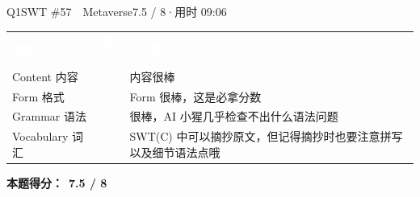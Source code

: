 \begin{qblock}{Q1\quad SWT \#57\ \ Metaverse}{7.5 / 8\quad·\quad 用时 09:06}
{\small\scorehead
\begin{tabularx}{\linewidth}{l c Y}
\textcolor{white}{\bfseries 维度} & \textcolor{white}{\bfseries 得分} & \textcolor{white}{\bfseries AI 建议}\\
Content 内容        &    & 内容很棒\\
Form 格式          &    & Form 很棒，这是必拿分数\\
Grammar 语法       &    & 很棒，AI 小猩几乎检查不出什么语法问题\\
Vocabulary 词汇    &  & SWT(C) 中可以摘抄原文，但记得摘抄时也要注意拼写以及细节语法点哦\\
\end{tabularx}}
\smallskip
\textbf{本题得分：}\ {\color{cAccent}\bfseries 7.5 / 8}

\end{qblock}

